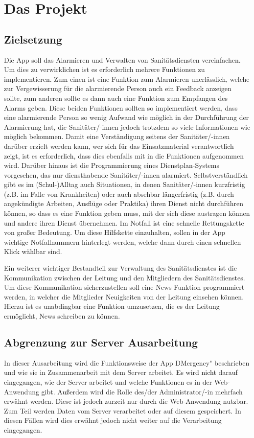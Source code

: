 \section{Das Projekt}
\subsection{Zielsetzung}
    Die App soll das Alarmieren und Verwalten von Sanitätsdiensten vereinfachen. Um dies
    zu verwirklichen ist es erforderlich mehrere Funktionen zu implementieren. Zum 
    einen ist eine Funktion zum Alarmieren unerlässlich, welche zur Vergewisserung für
    die alarmierende Person auch ein Feedback anzeigen sollte, zum anderen sollte es 
    dann auch eine Funktion zum Empfangen des Alarms geben. Diese beiden Funktionen 
    sollten so implementiert werden, dass eine alarmierende Person so wenig Aufwand wie 
    möglich in der Durchführung der Alarmierung hat, die Sanitäter/-innen jedoch trotzdem 
    so viele Informationen wie möglich bekommen. Damit eine Verständigung seitens der 
    Sanitäter/-innen darüber erzielt werden kann, wer sich für das Einsatzmaterial 
    verantwortlich zeigt, ist es erforderlich, dass dies ebenfalls mit in die Funktionen 
    aufgenommen wird.
    Darüber hinaus ist die Programmierung eines Dienstplan-Systems vorgesehen, das nur
    diensthabende Sanitäter/-innen alarmiert.
    Selbstverständlich gibt es im (Schul-)Alltag auch Situationen, in denen Sanitäter/-innen
    kurzfristig (z.B. im Falle von Krankheiten) oder auch absehbar längerfristig (z.B.
    durch angekündigte Arbeiten, Ausflüge oder Praktika) ihren Dienst nicht durchführen 
    können, so dass es eine Funktion geben muss, mit der sich diese austragen können und
    andere ihren Dienst übernehmen.
    Im Notfall ist eine schnelle Rettungskette von großer Bedeutung. Um diese Hilfskette
    \cite{Rettungskette} einzuhalten, sollen in der App wichtige Notfallnummern hinterlegt
    werden, welche dann durch einen schnellen Klick wählbar sind.
    
    Ein weiterer wichtiger Bestandteil zur Verwaltung des Sanitätsdienstes 
    ist die Kommunikation zwischen der Leitung und den Mitgliedern des Sanitätsdienstes.
    Um diese Kommunikation sicherzustellen soll eine News-Funktion programmiert werden, 
    in welcher die Mitglieder Neuigkeiten von der Leitung einsehen können.
    Hierzu ist es unabdingbar eine Funktion umzusetzen, die es der Leitung ermöglicht,
    \glqq News schreiben\grqq{} zu können.

\subsection{Abgrenzung zur Server Ausarbeitung}
    In dieser Ausarbeitung wird die Funktionsweise der App \glqq DMergency" \grqq{} 
    beschrieben und wie sie in Zusammenarbeit mit dem Server arbeitet. Es wird nicht 
    darauf eingegangen, wie der Server arbeitet und welche Funktionen es in der 
    Web-Anwendung gibt. Außerdem wird die Rolle des/der Administrator/-in mehrfach erwähnt werden.
    Diese ist jedoch zurzeit nur durch die Web-Anwendung nutzbar.
    Zum Teil werden Daten vom Server verarbeitet oder auf diesem 
    gespeichert. In diesen Fällen wird dies erwähnt jedoch nicht weiter auf die
    Verarbeitung eingegangen.